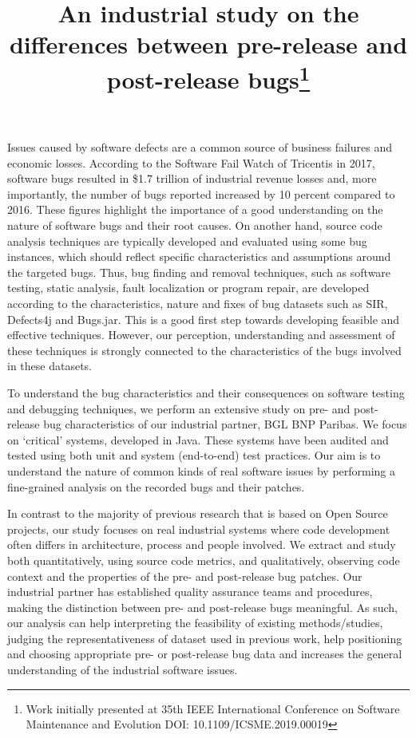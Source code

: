 \documentclass[conference]{IEEEtran}
\newcommand{\bgl}{BGL BNP Paribas}
\begin{document}
\title{An industrial study on the differences between pre-release and post-release bugs\thanks{Work initially presented at 35th IEEE International Conference on Software Maintenance and Evolution 
DOI: 10.1109/ICSME.2019.00019}}

\author{
}

\maketitle


Issues caused by software defects are a common source of business failures and economic losses. According to the Software Fail Watch of Tricentis in 2017, software bugs resulted in \$1.7 trillion of industrial revenue losses and, more importantly, the number of bugs reported increased by 10 percent compared to 2016. These figures highlight the importance of a good understanding on the nature of software bugs and their root causes. On another hand, source code analysis techniques are typically developed and evaluated using some bug instances, which should reflect specific characteristics and assumptions around the targeted bugs. Thus, bug finding and removal techniques, such as software testing, static analysis, fault localization or program repair, are developed according to the characteristics, nature and fixes of bug datasets such as SIR, Defects4j and Bugs.jar. This is a good first step towards developing feasible and effective techniques. However, our perception, understanding and assessment of these techniques is strongly connected to the characteristics of the bugs involved in these datasets.

To understand the bug characteristics and their consequences on software testing and debugging techniques, we perform an extensive study on pre- and post-release bug characteristics of our industrial partner, \bgl. We focus on `critical' systems, developed in Java. These systems have been audited and tested using both unit and system (end-to-end) test practices. Our aim is to understand the nature of common kinds of real software issues by performing a fine-grained analysis on the recorded bugs and their patches. 

In contrast to the majority of previous research that is based on Open Source projects, our study focuses on real industrial systems where code development often differs in architecture, process and people involved. We extract and study both quantitatively, using source code metrics, and qualitatively, observing code context and the  properties of the pre- and post-release bug patches. Our industrial partner has established quality assurance teams and procedures, making the distinction between pre- and post-release bugs meaningful. As such, our analysis can help interpreting the feasibility of existing methods/studies, judging the representativeness of dataset used in previous work, help positioning and choosing appropriate pre- or post-release bug data and increases the general understanding of the industrial software issues. 
\end{document}
